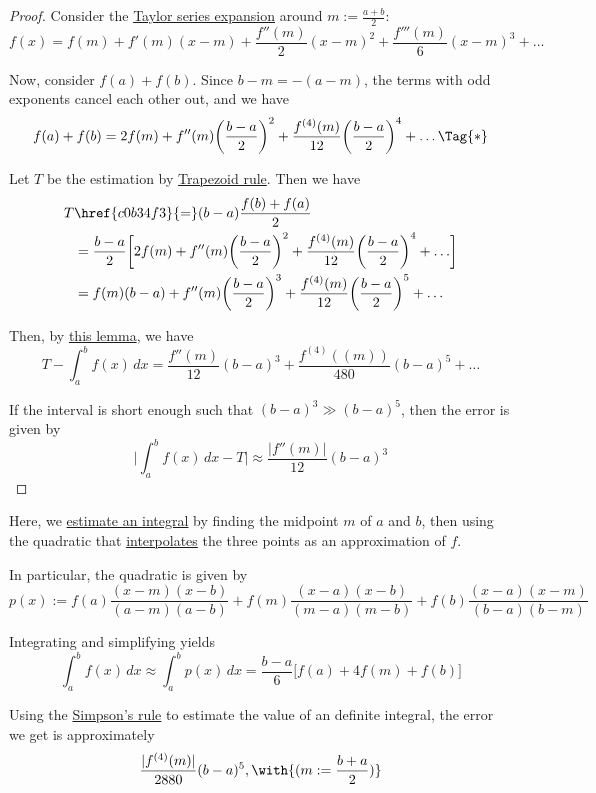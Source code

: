 \begin{proof}
  Consider the \href{ab7e885}{Taylor series expansion} around
  $m:=\frac{a+b}{2}$:
  $$
    f(x)=f(m)+f'(m)(x-m)+\frac{f''(m)}{2}(x-m)^2+\frac{f'''(m)}{6}(x-m)^3+\ldots
  $$

  Now, consider $f(a)+f(b)$. Since $b-m=-(a-m)$, the terms with odd exponents
  cancel each other out, and we have
  \begin{equation*}
    f(a)+f(b)=2f(m)+f''(m)\biggl(\frac{b-a}2\biggr)^2+\frac{f^{(4)}(m)}{12}\biggl(\frac{b-a}2\biggr)^4+\ldots\Tag{*}
  \end{equation*}

  Let $T$ be the estimation by \href{c0b34f3}{Trapezoid rule}. Then we have
  \begin{align*}
    T &\href{c0b34f3}{=}(b-a)\frac{f(b)+f(a)}{2}                                                                                 \\
      &=\frac{b-a}2\biggl[2f(m)+f''(m)\biggl(\frac{b-a}2\biggr)^2+\frac{f^{(4)}(m)}{12}\biggl(\frac{b-a}2\biggr)^4+\ldots\biggr] \\
      &=f(m)(b-a)+f''(m)\biggl(\frac{b-a}2\biggr)^3+\frac{f^{(4)}(m)}{12}\biggl(\frac{b-a}2\biggr)^5+\ldots
  \end{align*}

  Then, by \href{b024138}{this lemma}, we have
  $$
    T-\int_a^bf(x)\,dx=\frac{f''(m)}{12}(b-a)^3+\frac{f^{(4)}((m))}{480}(b-a)^5+\ldots
  $$

  If the interval is short enough such that $(b-a)^3\gg(b-a)^5$, then the error
  is given by
  $$
    \biggl|\int_a^bf(x)\,dx-T\biggr|\approx\frac {|f''(m)|}{12}(b-a)^3
  $$
\end{proof}

\label{a4f90dc}

Here, we \href{db6037a}{estimate an integral} by finding the midpoint $m$ of
$a$ and $b$, then using the quadratic that \href{a33bce0}{interpolates} the
three points as an approximation of $f$.

In particular, the quadratic is given by
$$
  p(x):=f(a)\frac{(x-m)(x-b)}{(a-m)(a-b)}
  +f(m)\frac{(x-a)(x-b)}{(m-a)(m-b)}
  +f(b)\frac{(x-a)(x-m)}{(b-a)(b-m)}
$$

Integrating and simplifying yields
$$
  \int_a^bf(x)\,dx\approx\int_a^bp(x)\,dx=\frac{b-a}6\bigl[f(a)+4f(m)+f(b)\bigr]
$$

\label{a0a6c2c}

Using the \href{a4f90dc}{Simpson's rule} to estimate the value of an definite
integral, the error we get is approximately
$$
  \frac{|f^{(4)}(m)|}{2880}(b-a)^5,\with{(m:=\frac{b+a}{2})}
$$

